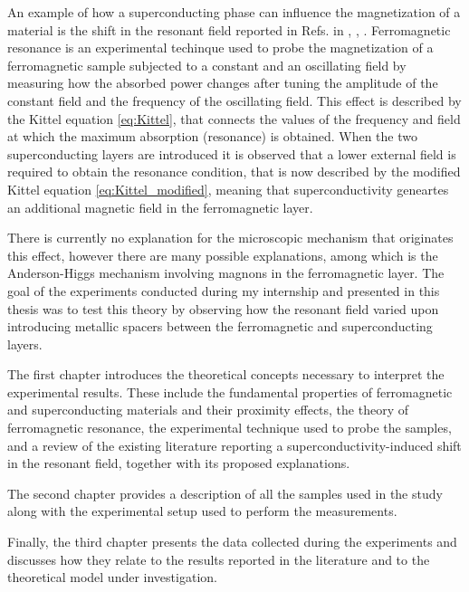 \documentclass[12pt,a4paper,oneside,openany]{book}
\begin{document}
An example of how a superconducting phase can influence the magnetization of a material is the shift in the resonant field reported in Refs. in \cite{Magnetization}, \cite{First_Evidence_1}, \cite{First_Evidence_2}. Ferromagnetic resonance is an experimental techinque used to probe the magnetization of a ferromagnetic sample subjected to a constant and an oscillating field by measuring how the absorbed power changes after tuning the amplitude of the constant field and the frequency of the oscillating field. This effect is described by the Kittel equation \eqref{eq:Kittel}, that connects the values of the frequency and field at which the maximum absorption (resonance) is obtained. When the two superconducting layers are introduced it is observed that a lower external field is required to obtain the resonance condition, that is now described by the modified Kittel equation \eqref{eq:Kittel_modified}, meaning that superconductivity geneartes an additional magnetic field in the ferromagnetic layer.

There is currently no explanation for the microscopic mechanism that originates this effect, however there are many possible explanations, among which is the Anderson-Higgs mechanism involving magnons in the ferromagnetic layer. The goal of the experiments conducted during my internship and presented in this thesis was to test this theory by observing how the resonant field varied upon introducing metallic spacers between the ferromagnetic and superconducting layers.   

The first chapter introduces the theoretical concepts necessary to interpret the experimental results. These include the fundamental properties of ferromagnetic and superconducting materials and their proximity effects, the theory of ferromagnetic resonance, the experimental technique used to probe the samples, and a review of the existing literature reporting a superconductivity-induced shift in the resonant field, together with its proposed explanations.

The second chapter provides a description of all the samples used in the study along with the experimental setup used to perform the measurements.

Finally, the third chapter presents the data collected during the experiments and discusses how they relate to the results reported in the literature and to the theoretical model under investigation.
\end{document}
